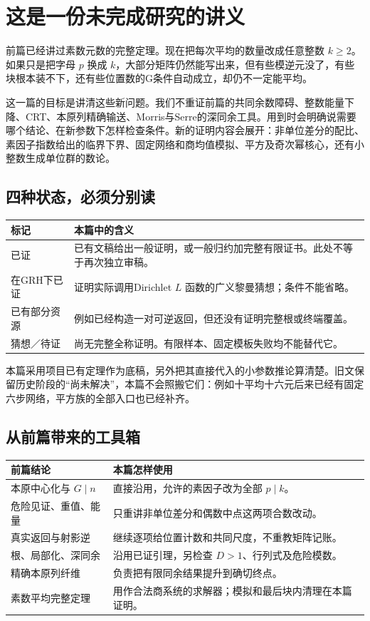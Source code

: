 \chapter*{这是一份未完成研究的讲义}
前篇已经讲过素数元数的完整定理。现在把每次平均的数量改成任意整数 $k\ge2$。如果只是把字母 $p$ 换成 $k$，大部分矩阵仍然能写出来，但有些模逆元没了，有些块根本装不下，还有些位置数的G条件自动成立，却仍不一定能平均。

这一篇的目标是讲清这些新问题。我们不重证前篇的共同余数障碍、整数能量下降、CRT、本原列精确输送、Morris与Serre的深同余工具。用到时会明确说需要哪个结论、在新参数下怎样检查条件。新的证明内容会展开：非单位差分的配比、素因子指数给出的临界下界、固定网络和商均值模拟、平方及奇次幂核心，还有小整数生成单位群的数论。

\section*{四种状态，必须分别读}
\begin{longtable}{p{}p{}}
\toprule 标记&本篇中的含义\\\midrule
已证&已有文稿给出一般证明，或一般归约加完整有限证书。此处不等于再次独立审稿。\\
在GRH下已证&证明实际调用Dirichlet $L$ 函数的广义黎曼猜想；条件不能省略。\\
已有部分资源&例如已经构造一对可逆返回，但还没有证明完整根或终端覆盖。\\
猜想／待证&尚无完整全称证明。有限样本、固定模板失败均不能替代它。\\\bottomrule
\end{longtable}
本篇采用项目已有定理作为底稿，另外把其直接代入的小参数推论算清楚。旧文保留历史阶段的“尚未解决”，本篇不会照搬它们：例如十平均十六元后来已经有固定六步网络，平方族的全部入口也已经补齐。

\section*{从前篇带来的工具箱}
\begin{longtable}{p{}p{}}
\toprule 前篇结论&本篇怎样使用\\\midrule
本原中心化与 $G\mid n$&直接沿用，允许的素因子改为全部 $p\mid k$。\\
危险见证、重值、能量&只重讲非单位差分和偶数中点这两项合数改动。\\
真实返回与射影逆&继续逐项给位置计数和共同尺度，不重教矩阵记账。\\
根、局部化、深同余&沿用已证引理，另检查 $D>1$、行列式及危险模数。\\
精确本原列纤维&负责把有限同余结果提升到确切终点。\\
素数平均完整定理&用作合法商系统的求解器；模拟和最后块内清理在本篇证明。\\\bottomrule
\end{longtable}

